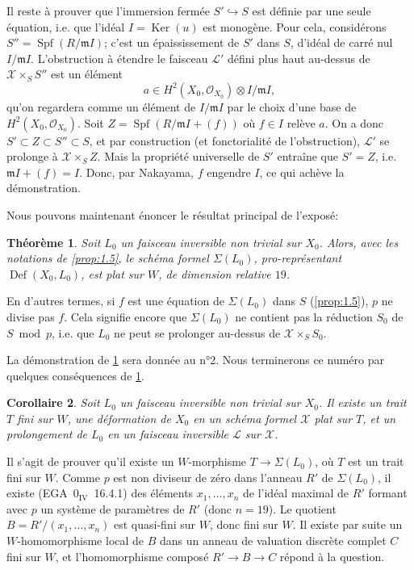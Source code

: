 \documentclass[12pt,a4paper]{article}
\theoremstyle{plain}
\newtheorem{theorem}{Théorème}[section]
\newtheorem{corollary}[theorem]{Corollaire}
\theoremstyle{definition}
\theoremstyle{remark}
\DeclareMathOperator{\Def}{Def}
\DeclareMathOperator{\Spf}{Spf}
\DeclareMathOperator{\Ker}{Ker}
\begin{document}
Il reste à prouver que l'immersion fermée $S' \hookrightarrow S$ est définie par une seule équation, i.e. que l'idéal $I = \Ker(u)$ est monogène. Pour cela, considérons $S'' = \Spf(R/\mathfrak{m}I)$; c'est un épaississement de $S'$ dans $S$, d'idéal de carré nul $I/\mathfrak{m}I$. L'obstruction à étendre le faisceau $\mathcal{L}'$ défini plus haut au-dessus de $\mathcal{X} \times_S S''$ est un élément
\[
a \in H^2(X_0, \mathcal{O}_{X_0}) \otimes I/\mathfrak{m}I,
\]
qu'on regardera comme un élément de $I/\mathfrak{m}I$ par le choix d'une base de $H^2(X_0, \mathcal{O}_{X_0})$. Soit $Z = \Spf(R/\mathfrak{m}I + (f))$ où $f \in I$ relève $a$. On a donc $S' \subset Z \subset S'' \subset S$, et par construction (et fonctorialité de l'obstruction), $\mathcal{L}'$ se prolonge à $\mathcal{X} \times_S Z$. Mais la propriété universelle de $S'$ entraîne que $S' = Z$, i.e. $\mathfrak{m}I + (f) = I$. Donc, par Nakayama, $f$ engendre $I$, ce qui achève la démonstration.

\medskip
Nous pouvons maintenant énoncer le résultat principal de l'exposé:

\begin{theorem}\label{thm:1.6}
Soit $L_0$ un faisceau inversible non trivial sur $X_0$. Alors, avec les notations de \ref{prop:1.5}, le schéma formel $\Sigma(L_0)$, pro-représentant $\Def(X_0, L_0)$, est plat sur $W$, de dimension relative $19$.
\end{theorem}

En d'autres termes, si $f$ est une équation de $\Sigma(L_0)$ dans $S$ (\ref{prop:1.5}), $p$ ne divise pas $f$. Cela signifie encore que $\Sigma(L_0)$ ne contient pas la réduction $S_0$ de $S \bmod p$, i.e. que $L_0$ ne peut se prolonger au-dessus de $\mathcal{X} \times_S S_0$.

La démonstration de \ref{thm:1.6} sera donnée au n°2. Nous terminerons ce numéro par quelques conséquences de \ref{thm:1.6}.

\begin{corollary}\label{cor:1.7}
Soit $L_0$ un faisceau inversible non trivial sur $X_0$. Il existe un trait $T$ fini sur $W$, une déformation de $X_0$ en un schéma formel $\mathcal{X}$ plat sur $T$, et un prolongement de $L_0$ en un faisceau inversible $\mathcal{L}$ sur $\mathcal{X}$.
\end{corollary}

Il s'agit de prouver qu'il existe un $W$-morphisme $T \to \Sigma(L_0)$, où $T$ est un trait fini sur $W$. Comme $p$ est non diviseur de zéro dans l'anneau $R'$ de $\Sigma(L_0)$, il existe (EGA~0$_{\mathrm{IV}}$~16.4.1) des éléments $x_1, \ldots, x_n$ de l'idéal maximal de $R'$ formant avec $p$ un système de paramètres de $R'$ (donc $n = 19$). Le quotient $B = R'/(x_1, \ldots, x_n)$ est quasi-fini sur $W$, donc fini sur $W$. Il existe par suite un $W$-homomorphisme local de $B$ dans un anneau de valuation discrète complet $C$ fini sur $W$, et l'homomorphisme composé $R' \to B \to C$ répond à la question.
\end{document}
